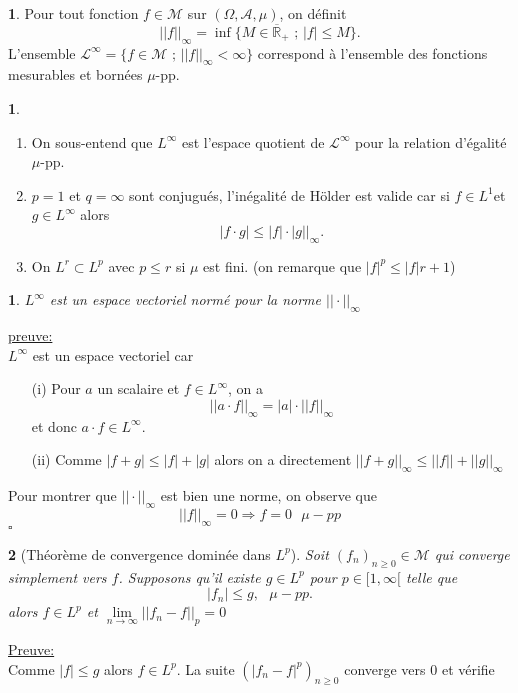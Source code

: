 \documentclass[8pt,notheorems]{beamer}
\def \R{\mathbb{R}}
\newtheorem{theorem}{\translate{Theorem}}[section]
\newtheorem{theorem}{\translate{Theoreme}}
\theoremstyle{definition}
\newtheorem{definition}{\translate{Definition}}
\theoremstyle{example}
\newtheorem{remark}{\translate{Remarque}}
\theoremstyle{mystyle}
\theoremstyle{plain}
\begin{document}
\begin{frame}[allowframebreaks]
\begin{definition}
Pour tout fonction $f\in\mathcal{M}$ sur $(\Omega,\mathcal{A}, \mu)$, on définit
$$
||f||_\infty = \inf\{M \in \overline{\R}_+\text{ ; }|f|\leq M\}.
$$ 
L'ensemble $\mathcal{L}^\infty = \{f\in\mathcal{M}\text{ ; }||f||_\infty<\infty\}$ correspond à l'ensemble des fonctions mesurables et bornées $\mu$-pp. 
\end{definition}
\begin{remark}
\begin{enumerate}
    \item On sous-entend que $L^\infty$ est l'espace quotient de $\mathcal{L}^\infty$ pour la relation d'égalité $\mu$-pp.
    \item $p=1$ et $q = \infty$ sont conjugués, l'inégalité de Hölder est valide car si $f\in L^1$et  $g\in L^\infty$ alors 
    $$
    |f\cdot g|\leq |f|\cdot|g||_\infty.
    $$
    \item On $L^r\subset L^p$ avec $p\leq r$ si $\mu$ est fini. (on remarque que $|f|^p\leq |f|r + 1$)  
\end{enumerate}
\end{remark}
\begin{theorem}
$L^\infty$ est un espace vectoriel normé pour la norme $||\cdot||_\infty$
\end{theorem}
\underline{preuve:}\\
$L^\infty$ est un espace vectoriel car 
\begin{enumerate}
    \item[(i)] Pour $a$ un scalaire et $f\in L^\infty$, on a 
    $$
    ||a\cdot f||_\infty = |a|\cdot||f||_\infty
    $$
    et donc $a\cdot f\in L^\infty$.
    \item[(ii)] Comme $|f+g|\leq |f|+|g|$ alors on a directement 
    $||f+g||_\infty\leq ||f||+||g||_\infty$
\end{enumerate}
Pour montrer que $||\cdot||_\infty$ est bien une norme, on observe que 
$$
||f||_\infty = 0 \Rightarrow f =0\text{ }\mu-pp
$$
$\square$
\begin{theorem}[Théorème de convergence dominée dans $L^p$]
Soit $(f_n)_{n\geq 0}\in\mathcal{M}$ qui converge simplement vers $f$. Supposons qu'il existe $g\in L^p$ pour $p\in[1,\infty[$ telle que 
$$
|f_n|\leq g,\text{ }\mu-pp.
$$
alors $f \in L^p$ et $\underset{n\rightarrow\infty}{\lim}||f_n-f||_p  =0$
\end{theorem}
\underline{Preuve:}\\
Comme $|f|\leq g$ alors $f\in L^p$. La suite $(|f_n-f|^p)_{n\geq 0}$ converge vers $0$ et vérifie 

\end{frame}
\end{document}

